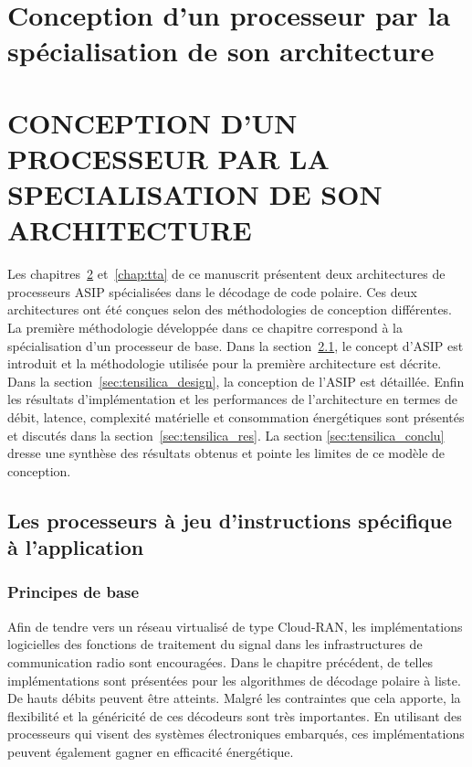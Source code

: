 

{
\chapter{Conception d'un processeur par la spécialisation de son architecture} %
\label{chap:tensilica}
}
{
\chapter{CONCEPTION D'UN PROCESSEUR PAR LA SPECIALISATION DE SON ARCHITECTURE}
\label{chap:tensilica}
}


Les chapitres~\ref{chap:tensilica} et~\ref{chap:tta} de ce manuscrit présentent deux architectures de processeurs ASIP spécialisées dans le décodage de code polaire. Ces deux architectures ont été conçues selon des méthodologies de conception différentes. La première méthodologie développée dans ce chapitre correspond à la spécialisation d'un processeur de base. Dans la section~\ref{sec:asips}, le concept d'ASIP est introduit et la méthodologie utilisée pour la première architecture est décrite. Dans la section~\ref{sec:tensilica_design}, la conception de l'ASIP est détaillée. Enfin les résultats d'implémentation et les performances de l'architecture en termes de débit, latence, complexité matérielle et consommation énergétiques sont présentés et discutés dans la section~\ref{sec:tensilica_res}. La section \ref{sec:tensilica_conclu} dresse une synthèse des résultats obtenus et pointe les limites de ce modèle de conception.


{
\vspace*{\fill}
\minitocTITI
\vspace*{\fill}
\newpage
}
{
}


\section{Les processeurs à jeu d'instructions spécifique à l'application}
\label{sec:asips}

\subsection{Principes de base}

Afin de tendre vers un réseau virtualisé de type Cloud-RAN, les implémentations logicielles des fonctions de traitement du signal dans les infrastructures de communication radio sont encouragées. Dans le chapitre précédent, de telles implémentations sont présentées pour les algorithmes de décodage polaire à liste. De hauts débits peuvent être atteints. Malgré les contraintes que cela apporte, la flexibilité et la généricité de ces décodeurs sont très importantes. En utilisant des processeurs qui visent des systèmes électroniques embarqués, ces implémentations peuvent également gagner en efficacité énergétique.

